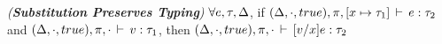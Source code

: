 \begin{lemma}
\emph{(\textbf{Substitution Preserves Typing})}
\label{thm:fb-substitution}
$\forall e, \tau, \Delta$, if $(\Delta,\cdot,true),\pi,[x
\mapsto \tau_1]\,\vdash\,e:\tau_2$ and $(\Delta,\cdot,true),\pi,
\cdot\,\vdash\,v:\tau_1$, then $(\Delta,\cdot,true),\pi,
\cdot\,\vdash\,[v/x]e:\tau_2$
\end{lemma}
